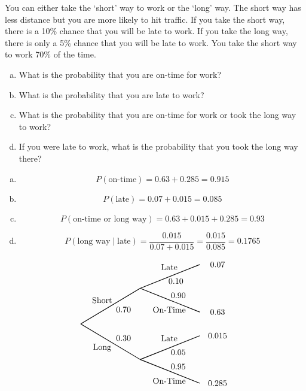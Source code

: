 \documentclass[11pt,letterpaper]{article}
\begin{document}
 You can either take the `short' way to work or the `long' way. The short way has less distance but you are more likely to hit traffic. If you take the short way, there is a 10\% chance that you will be late to work. If you take the long way, there is only a 5\% chance that you will be late to work. You take the short way to work 70\% of the time.
	\begin{enumerate}[(a)]
	\item What is the probability that you are on-time for work?
	\item What is the probability that you are late to work?
	\item What is the probability that you are on-time for work or took the long way to work?
	\item If you were late to work, what is the probability that you took the long way there?
	\end{enumerate} \pspace

\sol 
\begin{enumerate}[(a)]
\item 
	\[
	P(\text{on-time})= 0.63 + 0.285= 0.915
	\]

\item 
	\[
	P(\text{late})= 0.07 + 0.015= 0.085
	\]

\item 
	\[
	P(\text{on-time or long way})= 0.63 + 0.015 + 0.285= 0.93
	\]

\item 
	\[
	P(\text{long way} \;|\; \text{late})= \dfrac{0.015}{0.07 + 0.015}= \dfrac{0.015}{0.085}= 0.1765
	\]
\end{enumerate} \vfill

		\[
		\begin{tikzpicture}[scale= 1.0]
		\def\FirstUpLabel{Short}
		\def\FirstDownLabel{Long}
		\def\SecondUpLabel{Late}
		\def\SecondDownLabel{On-Time}
		\def\Up{$0.70$}
		\def\Down{$0.30$}
		\def\UpUp{$0.10$}
		\def\UpDown{$0.90$}
		\def\DownUp{$0.05$}
		\def\DownDown{$0.95$}
		\def\first{$0.07$}
		\def\second{$0.63$}
		\def\third{$0.015$}
		\def\fourth{$0.285$}
		
		\node at (0.9,1) {\FirstUpLabel};	
		\node at (0.9,-1) {\FirstDownLabel};	
		\node at (1.8,0.6) {\Up};
		\node at (1.8,-0.6) {\Down};
		\draw[thick] (0,0) -- (2.5,1.5);
		\draw[thick] (0,0) -- (2.5,-1.5);
		
		\node at (3.72,2.4) {\SecondUpLabel};
		\node at (3.72,0.6) {\SecondDownLabel};
		\node at (4,1.8) {\UpUp};
		\node at (4.1,1.2) {\UpDown};
		\node at (5.75,2.5) {\first};
		\node at (5.75,0.5) {\second};
		\draw[thick] (2.5,1.5) -- (5,2.5);
		\draw[thick] (2.5,1.5) -- (5,0.5);

		\node at (3.72,-0.6) {\SecondUpLabel};
		\node at (3.72,-2.4) {\SecondDownLabel};
		\node at (4.1,-1.2) {\DownUp};
		\node at (4.1,-1.8) {\DownDown};
		\node at (5.75,-0.5) {\third};	
		\node at (5.75,-2.5) {\fourth};	
		\draw[thick] (2.5,-1.5) -- (5,-0.5);
		\draw[thick] (2.5,-1.5) -- (5,-2.5);
		\end{tikzpicture}
		\]
\end{document}

